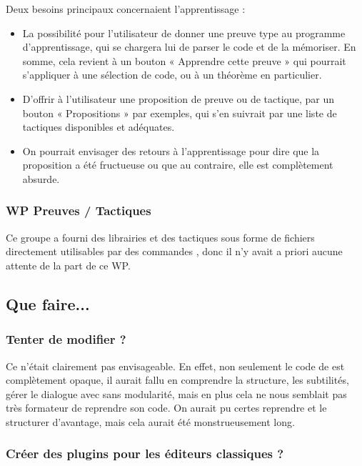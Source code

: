 Deux besoins principaux concernaient l'apprentissage :
\begin{itemize}
  \item La possibilité pour l'utilisateur de donner une preuve type au programme d'apprentissage, qui se chargera lui de parser le code et de la mémoriser. En somme, cela revient à un bouton « Apprendre cette preuve » qui pourrait s'appliquer à une sélection de code, ou à un théorème en particulier.
  \item D'offrir à l'utilisateur une proposition de preuve ou de tactique, par un bouton « Propositions » par exemples, qui s'en suivrait par une liste de tactiques disponibles et adéquates.
  \item On pourrait envisager des retours à l'apprentissage pour dire que la proposition a été fructueuse ou que au contraire, elle est complètement absurde.
\end{itemize}
      
\subsubsection{WP Preuves / Tactiques}
Ce groupe a fourni des librairies et des tactiques sous forme de fichiers \Coq{} directement utilisables par des commandes \Coq{}, donc il n'y avait a priori aucune attente de la part de ce WP.

\subsection{Que faire...}

\subsubsection{Tenter de modifier \CoqIde{} ?}

Ce n'était clairement pas envisageable. En effet, non seulement le code de \CoqIde{} est complètement opaque, il aurait fallu en comprendre la structure, les subtilités, gérer le dialogue avec \Coq{} sans modularité, mais en plus cela ne nous semblait pas très formateur de reprendre son code. On aurait pu certes reprendre \CoqIde{} et le structurer d'avantage, mais cela aurait été monstrueusement long.

\subsubsection{Créer des plugins pour les éditeurs classiques ?}

